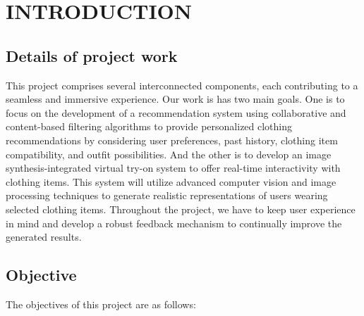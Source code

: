 \chapter[Introduction]{INTRODUCTION}

\section{Details of project work}
	This project comprises several interconnected components, each contributing to a seamless and immersive experience. Our work is has two main goals. One is to focus on the development of a recommendation system using collaborative and content-based filtering algorithms to provide personalized clothing recommendations by considering user preferences, past history, clothing item compatibility, and outfit possibilities. And the other is to develop an image synthesis-integrated virtual try-on system to offer real-time interactivity with clothing items. This system will utilize advanced computer vision and image processing techniques to generate realistic representations of users wearing selected clothing items. Throughout the project, we have to keep user experience in mind and develop a robust feedback mechanism to continually improve the generated results.

\section{Objective}
	The objectives of this project are as follows:

